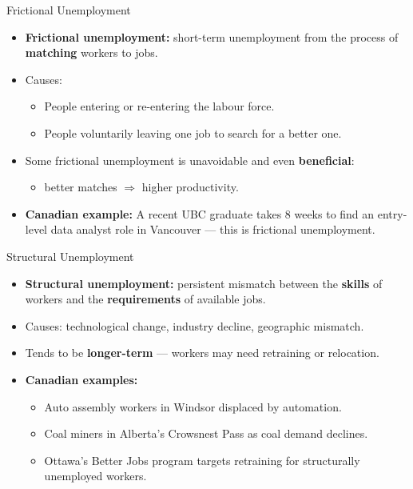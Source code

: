 \documentclass[aspectratio=169]{beamer}
\begin{document}
\begin{frame}{Frictional Unemployment}
\transfade
\begin{itemize}[<+->]
  \item \textbf{Frictional unemployment:} short-term unemployment from the process of \textbf{matching} workers to jobs.
  \item Causes:
  \begin{itemize}[<+->]
    \item People entering or re-entering the labour force.
    \item People voluntarily leaving one job to search for a better one.
  \end{itemize}
  \item Some frictional unemployment is \alert{unavoidable} and even \textbf{beneficial}:
  \begin{itemize}[<+->]
    \item better matches $\Rightarrow$ higher productivity.
  \end{itemize}
  \item \textbf{Canadian example:} A recent UBC graduate takes 8 weeks to find an entry-level data analyst role in Vancouver --- this is frictional unemployment.
\end{itemize}
\end{frame}

\begin{frame}{Structural Unemployment}
\transfade
\begin{itemize}[<+->]
  \item \textbf{Structural unemployment:} persistent mismatch between the \textbf{skills} of workers and the \textbf{requirements} of available jobs.
  \item Causes: technological change, industry decline, geographic mismatch.
  \item Tends to be \textbf{longer-term} --- workers may need retraining or relocation.
  \item \textbf{Canadian examples:}
  \begin{itemize}[<+->]
    \item Auto assembly workers in Windsor displaced by automation.
    \item Coal miners in Alberta's Crowsnest Pass as coal demand declines.
    \item Ottawa's Better Jobs program targets retraining for structurally unemployed workers.
  \end{itemize}
\end{itemize}
\end{frame}
\end{document}
